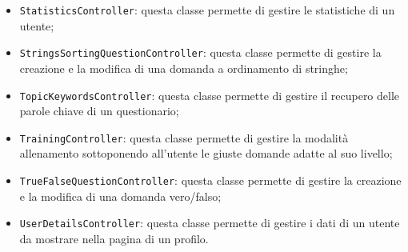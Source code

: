 \begin{itemize}
\begin{itemize}
		\item \texttt{StatisticsController}: questa classe permette di gestire le statistiche di un utente;
		\item \texttt{StringsSortingQuestionController}: questa classe permette di gestire la creazione e la modifica di una domanda a ordinamento di stringhe;
		\item \texttt{TopicKeywordsController}: questa classe permette di gestire il recupero delle parole chiave di un questionario;
		\item \texttt{TrainingController}: questa classe permette di gestire la modalità allenamento sottoponendo all'utente le giuste domande adatte al suo livello;
		\item \texttt{TrueFalseQuestionController}: questa classe permette di gestire la creazione e la modifica di una domanda	vero/falso;
		\item \texttt{UserDetailsController}: questa classe permette di gestire i dati di un utente da mostrare nella pagina di un profilo.
	\end{itemize} 
\end{itemize}